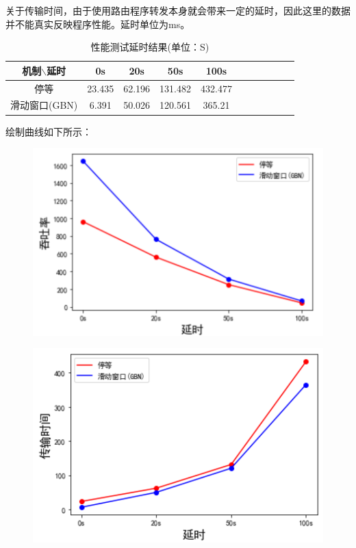 \documentclass[UTF8,a4paper,10pt]{ctexart}
\begin{document}
关于传输时间，由于使用路由程序转发本身就会带来一定的延时，因此这里的数据并不能真实反映程序性能。延时单位为ms。
\begin{table}[!htbp]
  \centering
  \begin{tabular}{ccccccccccc}
  \toprule  
  机制$\backslash$延时& 0s& 20s& 50s& 100s\\
  \midrule
  停等& 23.435& 62.196& 131.482& 432.477\\
  滑动窗口(GBN)& 6.391& 50.026& 120.561& 365.21\\
  \bottomrule
  \end{tabular}
  \caption{性能测试延时结果(单位：S)}
\end{table}

绘制曲线如下所示：
\begin{figure}[H]
    \centering
    \includegraphics[scale=0.6]{计网3.png}
    \label{fig:3}
\end{figure}
\begin{figure}[H]
    \centering
    \includegraphics[scale=0.6]{计网4.png}
    \label{fig:4}
\end{figure}
\end{document}

